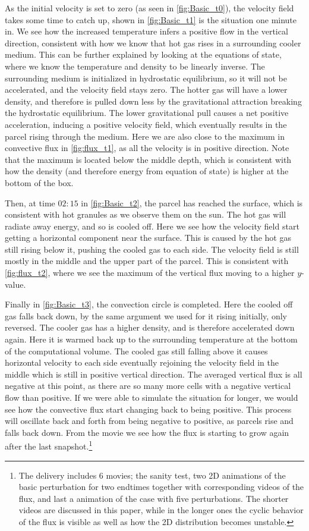 \documentclass[11pt,a4paper,twocolumn,titlepage]{article}
\begin{document}
As the initial velocity is set to zero (as seen in \ref{fig:Basic_t0}), the velocity field takes some time to catch up, shown in \ref{fig:Basic_t1} is the situation one minute in. We see how the increased temperature infers a positive flow in the vertical direction, consistent with how we know that hot gas rises in a surrounding cooler medium. This can be further explained by looking at the equations of state, where we know the temperature and density to be linearly inverse. The surrounding medium is initialized in hydrostatic equilibrium, so it will not be accelerated, and the velocity field stays zero. The hotter gas will have a lower density, and therefore is pulled down less by the gravitational attraction breaking the hydrostatic equilibrium. The lower gravitational pull causes a net positive acceleration, inducing a positive velocity field, which eventually results in the parcel rising through the medium. Here we are also close to the maximum in convective flux in \cref{fig:flux_t1}, as all the velocity is in positive direction. Note that the maximum is located below the middle depth, which is consistent with how the density (and therefore energy from equation of state) is higher at the bottom of the box.

Then, at time $02:15$ in \ref{fig:Basic_t2}, the parcel has reached the surface, which is consistent with hot granules as we observe them on the sun. The hot gas will radiate away energy, and so is cooled off. Here we see how the velocity field start getting a horizontal component near the surface. This is caused by the hot gas still rising below it, pushing the cooled gas to each side. The velocity field is still mostly in the middle and the upper part of the parcel. This is consistent with \cref{fig:flux_t2}, where we see the maximum of the vertical flux moving to a higher $y$-value.

Finally in \ref{fig:Basic_t3}, the convection circle is completed. Here the cooled off gas falls back down, by the same argument we used for it rising initially, only reversed. The cooler gas has a higher density, and is therefore accelerated down again. Here it is warmed back up to the surrounding temperature at the bottom of the computational volume. The cooled gas still falling above it causes horizontal velocity to each side eventually rejoining the velocity field in the middle which is still in positive vertical direction. The averaged vertical flux is all negative at this point, as there are so many more cells with a negative vertical flow than positive. If we were able to simulate the situation for longer, we would see how the convective flux start changing back to being positive. This process will oscillate back and forth from being negative to positive, as parcels rise and falls back down. From the movie we see how the flux is starting to grow again after the last snapshot.\footnote{The delivery includes 6 movies; the sanity test, two 2D animations of the basic perturbation for two endtimes together with corresponding videos of the flux, and last a animation of the case with five perturbations. The shorter videos are discussed in this paper, while in the longer ones the cyclic behavior of the flux is visible as well as how the 2D distribution becomes unstable.}
\end{document}
